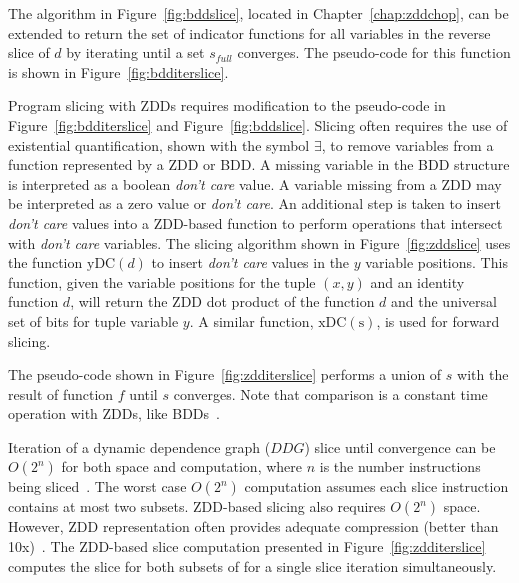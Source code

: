 {The algorithm in Figure~\ref{fig:bddslice}, located in Chapter~\ref{chap:zddchop}, can be extended to return the set of indicator functions for all variables in the reverse slice of $d$ by iterating until a set $s_{full}$ converges.  The pseudo-code for this function is shown in Figure~\ref{fig:bdditerslice}.

Program slicing with ZDDs requires modification to the pseudo-code in Figure~\ref{fig:bdditerslice} and Figure~\ref{fig:bddslice}. Slicing often requires the use of existential quantification, shown with the symbol $\exists$, to remove variables from a function represented by a ZDD or BDD. A missing variable in the BDD structure is interpreted as a boolean \textit{don't care} value. A variable missing from a ZDD may be interpreted as a zero value or \textit{don't care}.  An additional step is taken to insert \textit{don't care} values into a ZDD-based function to perform operations that intersect with \textit{don't care} variables.  The slicing algorithm shown in Figure~\ref{fig:zddslice} uses the function $\mathrm{yDC}(d)$ to insert \textit{don't care} values in the $y$ variable positions.  This function, given the variable positions for the tuple $(x,y)$ and an identity function $d$, will return the ZDD dot product\cite{mishchenko:01:sc} of the function $d$ and the universal set of bits for tuple variable $y$.  A similar function, $\mathrm{xDC(s)}$, is used for forward slicing.

The pseudo-code shown in Figure~\ref{fig:zdditerslice} performs a union of $s$ with the result of function $f$ until $s$ converges. Note that comparison is a constant time operation with ZDDs, like BDDs~\cite{bryant:86:ieeetc}.

Iteration of a dynamic dependence graph ($DDG$) slice until convergence can be $O(2^n)$ for both space and computation, where $n$ is the number instructions being sliced~\cite{agrawal:90:pldi,tip:94:cwi}.  The worst case $O(2^n)$ computation assumes each slice instruction contains at most two subsets. ZDD-based slicing also requires $O(2^n)$ space.  However, ZDD representation often provides adequate compression (better than 10x)~\cite{price:10:cgo}. The ZDD-based slice computation presented in Figure~\ref{fig:zdditerslice} computes the slice for both subsets of for a single slice iteration simultaneously.


}
